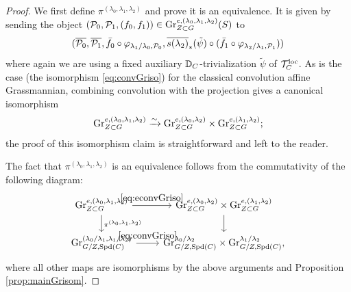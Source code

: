     \begin{proof}
We first define $\pi^{(\lambda_{0},\lambda_{1},\lambda_{2})}$ and prove it is an equivalence. It is given by sending the object $(\mathcal{P}_{0},\mathcal{P}_{1}, (f_{0}, f_{1})) \in \textnormal{Gr}_{Z \subset G}^{e,(\lambda_{0},\lambda_{1},\lambda_{2})} (S)$ to 
\begin{equation*}
(\overline{\mathcal{P}_{0}},\overline{\mathcal{P}_{1}},\bar{f}_{0} \circ \varphi_{\lambda_{1}/\lambda_{0},\mathcal{P}_{0}},\overline{s(\lambda_{2})}_{*}(\tilde{\psi})\circ (\bar{f}_{1} \circ \varphi_{\lambda_{2}/\lambda_{1},\mathcal{P}_{1}}))
\end{equation*}
where again we are using a fixed auxiliary $\mathbb D_{C}$-trivialization $\tilde{\psi}$ of $\mathcal{T}_{C}^{\mathrm{loc}}$. As is the case (the isomorphism \eqref{eq:convGriso}) for the classical convolution affine Grassmannian, combining convolution with the projection gives a canonical isomorphism
   \begin{equation}\label{eq:econvGriso}
        \textnormal{Gr}_{Z \subset G}^{e,(\lambda_{0},\lambda_{1},\lambda_{2})} \xrightarrow{\sim}  \textnormal{Gr}_{Z \subset G}^{e,(\lambda_{0},\lambda_{2})} \times \textnormal{Gr}_{Z \subset G}^{e,(\lambda_{1},\lambda_{2})};
   \end{equation}
   the proof of this isomorphism claim is straightforward and left to the reader.

   The fact that $\pi^{(\lambda_{0},\lambda_{1},\lambda_{2})}$ is an equivalence follows from the commutativity of the following diagram:
   \[
\begin{tikzcd}
     \tn{Gr}_{Z \subset G}^{e,(\lambda_{0},\lambda_{1},\lambda_{2})} \arrow["\eqref{eq:econvGriso}"]{r} \arrow["\pi^{(\lambda_{0},\lambda_{1},\lambda_{2})}"]{d} & \tn{Gr}_{Z \subset G}^{e,(\lambda_{0},\lambda_{2})} \times \tn{Gr}_{Z \subset G}^{e,(\lambda_{1},\lambda_{2})} \arrow{d} \\     \tn{Gr}_{G/Z,\Spd(C)}^{(\lambda_{0}/\lambda_{1},\lambda_{1}/\lambda_{2})} \arrow["\eqref{eq:convGriso}"]{r} & \tn{Gr}_{G/Z,\Spd(C)}^{\lambda_{0}/\lambda_{2}} \times \tn{Gr}_{G/Z,\Spd(C)}^{\lambda_{1}/\lambda_{2}},
\end{tikzcd}
   \]
   where all other maps are isomorphisms by the above arguments and Proposition \ref{prop:mainGrisom}.
   

\end{proof}
